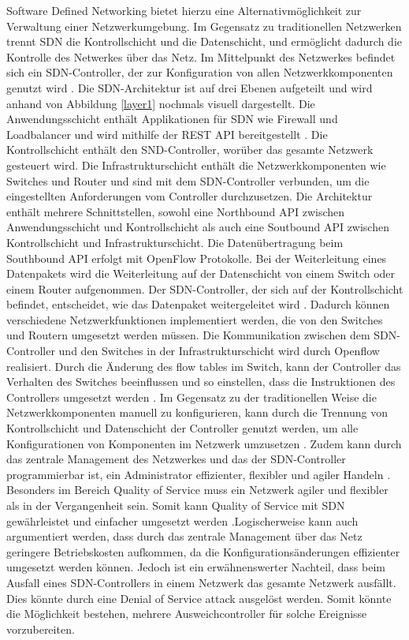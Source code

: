 \documentclass[fontsize=12pt,paper=a4,open=any,parskip=half,
  twoside=false,toc=listof,toc=bibliography,fleqn,leqno,
  captions=nooneline,captions=tableabove,british]{scrbook}
\begin{document}
Software Defined Networking bietet hierzu eine Alternativmöglichkeit zur Verwaltung einer Netzwerkumgebung. Im Gegensatz zu traditionellen Netzwerken trennt SDN die Kontrollschicht und die Datenschicht, und ermöglicht dadurch die Kontrolle des Netwerkes über das Netz. Im Mittelpunkt des Netzwerkes befindet sich ein SDN-Controller, der zur Konfiguration von allen Netzwerkkomponenten genutzt wird \cite{sdn1}. Die SDN-Architektur ist auf drei Ebenen aufgeteilt und wird anhand von Abbildung \ref{layer1} nochmals visuell dargestellt. Die Anwendungsschicht enthält Applikationen für SDN wie Firewall und Loadbalancer und wird mithilfe der REST API bereitgestellt \cite{james1}. Die Kontrollschicht enthält den SND-Controller, worüber das gesamte Netzwerk gesteuert wird. Die Infrastrukturschicht enthält die Netzwerkkomponenten wie Switches und Router und sind mit dem SDN-Controller verbunden, um die eingestellten Anforderungen vom Controller durchzusetzen. Die Architektur enthält mehrere Schnittstellen, sowohl eine Northbound API zwischen Anwendungsschicht und Kontrollschicht als auch eine Soutbound API zwischen Kontrollschicht und Infrastrukturschicht. Die Datenübertragung beim Southbound API erfolgt mit OpenFlow Protokolle. Bei der Weiterleitung eines Datenpakets wird die Weiterleitung auf der Datenschicht von einem Switch oder einem Router aufgenommen. Der SDN-Controller, der sich auf der Kontrollschicht befindet, entscheidet, wie das Datenpaket weitergeleitet wird \cite{james1}. Dadurch können verschiedene Netzwerkfunktionen implementiert werden, die von den Switches und Routern umgesetzt werden müssen. Die Kommunikation zwischen dem SDN-Controller und den Switches in der Infrastrukturschicht wird durch Openflow realisiert. Durch die Änderung des flow tables im Switch, kann der Controller das Verhalten des Switches beeinflussen und so einstellen, dass die Instruktionen des Controllers umgesetzt werden \cite{james1}. Im Gegensatz zu der traditionellen Weise die Netzwerkkomponenten manuell zu konfigurieren, kann durch die Trennung von Kontrollschicht und Datenschicht der Controller genutzt werden, um alle Konfigurationen von Komponenten im Netzwerk umzusetzen \cite{james3}. Zudem kann durch das zentrale Management des Netzwerkes und das der SDN-Controller programmierbar ist, ein Administrator effizienter, flexibler und agiler Handeln \cite{james1}. Besonders im Bereich Quality of Service muss ein Netzwerk agiler und flexibler als in der Vergangenheit sein. Somit kann Quality of Service mit SDN gewährleistet und einfacher umgesetzt werden \cite{james5}.Logischerweise kann auch argumentiert werden, dass durch das zentrale Management über das Netz geringere Betriebskosten aufkommen, da die Konfigurationsänderungen effizienter umgesetzt werden können.  Jedoch ist ein erwähnenswerter Nachteil, dass beim Ausfall eines SDN-Controllers in einem Netzwerk das gesamte Netzwerk ausfällt. Dies könnte durch eine Denial of Service attack ausgelöst werden. Somit könnte die Möglichkeit bestehen, mehrere Ausweichcontroller für solche Ereignisse vorzubereiten.
\newpage
\end{document}
